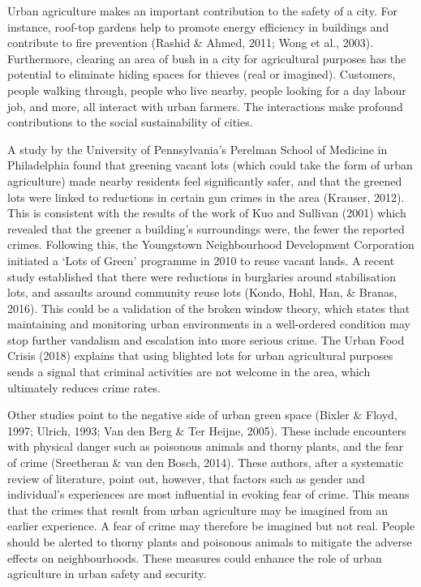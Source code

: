 Urban agriculture makes an important contribution to the safety of a city. For instance, roof-top gardens help to promote energy efficiency in buildings and contribute to fire prevention \cite{Hoornweg2012} (Rashid \& Ahmed, 2011; Wong et al., 2003). Furthermore, clearing an area of bush in a city for agricultural purposes has the potential to eliminate hiding spaces for thieves (real or imagined). Customers, people walking through, people who live nearby, people looking for a day labour job, and more, all interact with urban farmers. The interactions make profound contributions to the social sustainability of cities.

A study by the University of Pennsylvania's Perelman School of Medicine in Philadelphia found that greening vacant lots (which could take the form of urban agriculture) made nearby residents feel significantly safer, and that the greened lots were linked to reductions in certain gun crimes in the area (Krauser, 2012). This is consistent with the results of the work of Kuo and Sullivan (2001) which revealed that the greener a building's surroundings were, the fewer the reported crimes. Following this, the Youngstown Neighbourhood Development Corporation initiated a ‘Lots of Green’ programme in 2010 to reuse vacant lands. A recent study established that there were reductions in burglaries around stabilisation lots, and assaults around community reuse lots (Kondo, Hohl, Han, \& Branas, 2016). This could be a validation of the broken window theory, which states that maintaining and monitoring urban environments in a well-ordered condition may stop further vandalism and escalation into more serious crime. The Urban Food Crisis (2018) explains that using blighted lots for urban agricultural purposes sends a signal that criminal activities are not welcome in the area, which ultimately reduces crime rates.

Other studies point to the negative side of urban green space (Bixler \& Floyd, 1997; Ulrich, 1993; Van den Berg \& Ter Heijne, 2005). These include encounters with physical danger such as poisonous animals and thorny plants, and the fear of crime (Sreetheran \& van den Bosch, 2014). These authors, after a systematic review of literature, point out, however, that factors such as gender and individual's experiences are most influential in evoking fear of crime. This means that the crimes that result from urban agriculture may be imagined from an earlier experience. A fear of crime may therefore be imagined but not real. People should be alerted to thorny plants and poisonous animals to mitigate the adverse effects on neighbourhoods. These measures could enhance the role of urban agriculture in urban safety and security.

